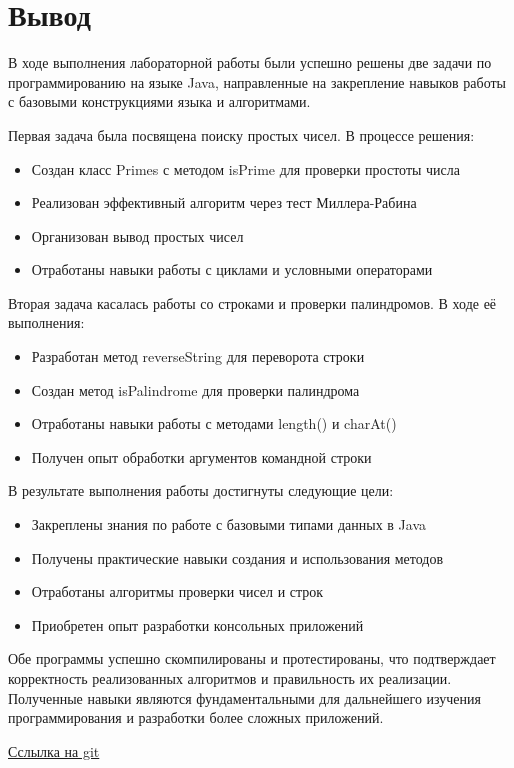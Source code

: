 \chapter*{Вывод}
\label{ch:Conclusion}

В ходе выполнения лабораторной работы были успешно решены две задачи по программированию на языке Java, направленные на закрепление навыков работы с базовыми конструкциями языка и алгоритмами.

Первая задача была посвящена поиску простых чисел. В процессе решения:

\begin{itemize}
  \item{Создан класс Primes с методом isPrime для проверки простоты числа}
  \item{Реализован эффективный алгоритм через тест Миллера-Рабина}
  \item{Организован вывод простых чисел}
  \item{Отработаны навыки работы с циклами и условными операторами}
\end{itemize}

Вторая задача касалась работы со строками и проверки палиндромов. В ходе её выполнения:

\begin{itemize}
\item{Разработан метод reverseString для переворота строки}
\item{Создан метод isPalindrome для проверки палиндрома}
\item{Отработаны навыки работы с методами length() и charAt()}
\item{Получен опыт обработки аргументов командной строки}
\end{itemize}

В результате выполнения работы достигнуты следующие цели:

\begin{itemize}
\item{Закреплены знания по работе с базовыми типами данных в Java}
\item{Получены практические навыки создания и использования методов}
\item{Отработаны алгоритмы проверки чисел и строк}
\item{Приобретен опыт разработки консольных приложений}
\end{itemize}

Обе программы успешно скомпилированы и протестированы, что подтверждает корректность реализованных алгоритмов и правильность их реализации. Полученные навыки являются фундаментальными для дальнейшего изучения программирования и разработки более сложных приложений.

\href{https://github.com/MArtyoma/labs/tree/main/sem_3/lab_1}{Сслылка на git}


\endinput



